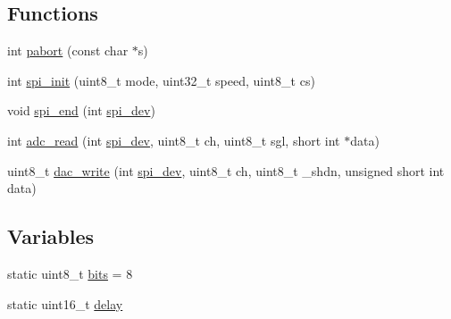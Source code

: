 \subsection*{Functions}
\begin{DoxyCompactItemize}
\item 
int \hyperlink{spi__functions_01_07C_xC3_xB3pia_01em_01conflito_01de_01Andr_xC3_xA9_01Carvalho_012013-04-26_08_8c_aabfca8320b0c76774f01467703e17302}{pabort} (const char $\ast$s)
\item 
int \hyperlink{spi__functions_01_07C_xC3_xB3pia_01em_01conflito_01de_01Andr_xC3_xA9_01Carvalho_012013-04-26_08_8c_a70764aca888e93b0329e7a62c9312704}{spi\-\_\-init} (uint8\-\_\-t mode, uint32\-\_\-t speed, uint8\-\_\-t cs)
\item 
void \hyperlink{spi__functions_01_07C_xC3_xB3pia_01em_01conflito_01de_01Andr_xC3_xA9_01Carvalho_012013-04-26_08_8c_a3fb02c6fc5990df81645306a81291624}{spi\-\_\-end} (int \hyperlink{CommunicationV0_2communication_8c_a4788f0a5355494bc6c13690e28f43783}{spi\-\_\-dev})
\item 
int \hyperlink{spi__functions_01_07C_xC3_xB3pia_01em_01conflito_01de_01Andr_xC3_xA9_01Carvalho_012013-04-26_08_8c_ae385345c227d9f67ab490b94ed628988}{adc\-\_\-read} (int \hyperlink{CommunicationV0_2communication_8c_a4788f0a5355494bc6c13690e28f43783}{spi\-\_\-dev}, uint8\-\_\-t ch, uint8\-\_\-t sgl, short int $\ast$data)
\item 
uint8\-\_\-t \hyperlink{spi__functions_01_07C_xC3_xB3pia_01em_01conflito_01de_01Andr_xC3_xA9_01Carvalho_012013-04-26_08_8c_a9fe5e6b0c564de89398a80e1689b717f}{dac\-\_\-write} (int \hyperlink{CommunicationV0_2communication_8c_a4788f0a5355494bc6c13690e28f43783}{spi\-\_\-dev}, uint8\-\_\-t ch, uint8\-\_\-t \-\_\-shdn, unsigned short int data)
\end{DoxyCompactItemize}
\subsection*{Variables}
\begin{DoxyCompactItemize}
\item 
static uint8\-\_\-t \hyperlink{spi__functions_01_07C_xC3_xB3pia_01em_01conflito_01de_01Andr_xC3_xA9_01Carvalho_012013-04-26_08_8c_a46a6da6b1936191571fd30b2a749f38c}{bits} = 8
\item 
static uint16\-\_\-t \hyperlink{spi__functions_01_07C_xC3_xB3pia_01em_01conflito_01de_01Andr_xC3_xA9_01Carvalho_012013-04-26_08_8c_adc4674f6ea53803d98fa2ec36759e77d}{delay}
\end{DoxyCompactItemize}


